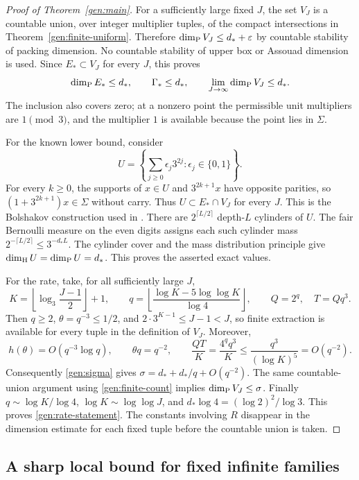 \begin{proof}[Proof of Theorem~\ref{gen:main}]
For a sufficiently large fixed $J$, the set $V_J$ is a countable
union, over integer multiplier tuples, of the compact intersections
in Theorem~\ref{gen:finite-uniform}.  Therefore
$\dim_{\mathrm P} V_J\le d_*+\varepsilon$ by countable stability of packing
dimension.  No countable stability of upper box or Assouad dimension
is used.  Since $E_*\subset V_J$ for every $J$, this proves
\[
 \dim_{\mathrm P} E_*\le d_*,\qquad
 \Gamma_*\le d_*,\qquad
 \lim_{J\to\infty}\dim_{\mathrm P} V_J\le d_*.
\]
The inclusion also covers zero; at a nonzero point the permissible
unit multipliers are $1\pmod3$, and the multiplier $1$ is available
because the point lies in $\Sigma$.

For the known lower bound, consider
\[
 U=\left\{\sum_{j\ge0}\epsilon_j3^{2j}:\epsilon_j\in\{0,1\}\right\}.
\]
For every $k\ge0$, the supports of $x\in U$ and $3^{2k+1}x$
have opposite parities, so $(1+3^{2k+1})x\in\Sigma$ without carry.
Thus $U\subset E_*\cap V_J$ for every $J$.  This is the
Bolshakov construction used in \cite[Theorem~6.3]{AL2014}.
There are $2^{\lceil L/2\rceil}$ depth-$L$ cylinders of $U$.
The fair Bernoulli measure on the even digits assigns each such
cylinder mass $2^{-\lceil L/2\rceil}\le3^{-d_*L}$.
The cylinder cover and the mass distribution principle give
$\dim_{\mathrm H} U=\dim_{\mathrm P} U=d_*$.  This proves the asserted exact values.

For the rate, take, for all sufficiently large $J$,
\[
 K=\left\lfloor\log_3\frac{J-1}{2}\right\rfloor+1,
 \qquad
 q=\left\lfloor\frac{\log K-5\log\log K}{\log4}\right\rfloor,
 \qquad Q=2^q,\quad T=Qq^3.
\]
Then $q\ge2$, $\theta=q^{-3}\le1/2$, and
$2\cdot3^{K-1}\le J-1<J$, so finite extraction is available for
every tuple in the definition of $V_J$.  Moreover,
\[
 h(\theta)=O(q^{-3}\log q),\qquad
 \theta q=q^{-2},\qquad
 \frac{QT}{K}=\frac{4^q q^3}{K}
       \le\frac{q^3}{(\log K)^5}=O(q^{-2}).
\]
Consequently \eqref{gen:sigma} gives
$\sigma=d_*+d_*/q+O(q^{-2})$.  The same countable-union argument
using \eqref{gen:finite-count} implies $\dim_{\mathrm P} V_J\le\sigma$.
Finally $q\sim\log K/\log4$, $\log K\sim\log\log J$, and
$d_*\log4=(\log2)^2/\log3$.  This proves
\eqref{gen:rate-statement}.  The constants involving $R$ disappear
in the dimension estimate for each fixed tuple before the countable
union is taken.
\end{proof}

\subsection{A sharp local bound for fixed infinite families}

